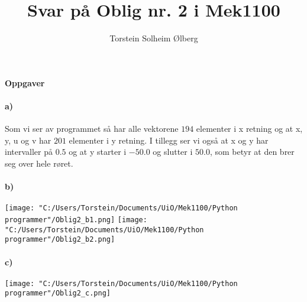 \documentclass[11pt, A4paper,norsk]{article}
\author{Torstein Solheim Ølberg}
\title{Svar på Oblig nr. 2 i Mek1100}
\begin{document}
\maketitle
	\begin{center}
\Large \textbf{Oppgaver}
	\end{center}









		\paragraph{a)}
			\begin{flushleft}

Som vi ser av programmet så har alle vektorene $194$ elementer i x retning og at x, y, u og v har $201$ elementer i y retning. I tillegg ser vi også at x og y har intervaller på $0.5$ og at y starter i $-50.0$ og slutter i $50.0$, som betyr at den brer seg over hele røret.
			\end{flushleft}










		\paragraph{b)}
			\begin{flushleft}

\texttt{[image: "C:/Users/Torstein/Documents/UiO/Mek1100/Python programmer"/Oblig2\_b1.png]}
\texttt{[image: "C:/Users/Torstein/Documents/UiO/Mek1100/Python programmer"/Oblig2\_b2.png]}
			\end{flushleft}









		\paragraph{c)}
			\begin{flushleft}

\texttt{[image: "C:/Users/Torstein/Documents/UiO/Mek1100/Python programmer"/Oblig2\_c.png]}
			\end{flushleft}
\end{document}
